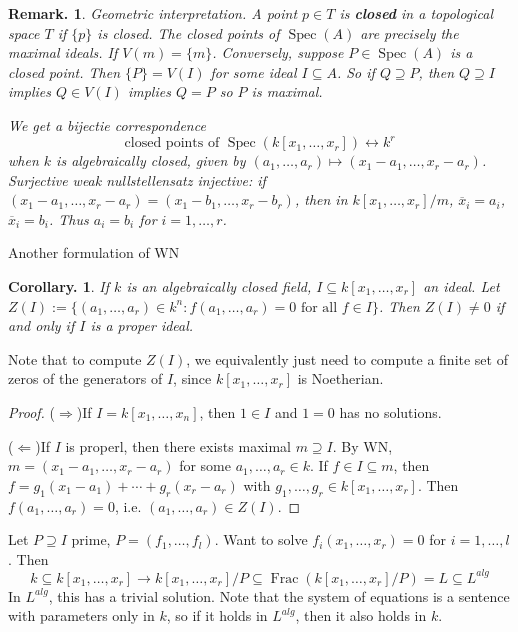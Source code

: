 \documentclass[11pt, a4paper]{memoir}
\newcommand{\impr}{{($\Rightarrow$)\hspace{0.2cm}}}
\newcommand{\impl}{{($\Leftarrow$)\hspace{0.2cm}}}
\newcommand{\ol}[1]{\ensuremath{\overline{#1}}}
\theoremstyle{change}
\newtheorem{corollary}[theorem]{Corollary.}
\theoremstyle{plain}
\theoremstyle{nonumberplain}
\newtheorem{remark}{Remark.}
\newtheorem{proof}{Proof}
\DeclareMathOperator{\Frac}{Frac}
\DeclareMathOperator{\Spec}{Spec}
\numberwithin{equation}{section}
\begin{document}
\begin{remark}
    Geometric interpretation.
    A point $p\in T$ is \textbf{closed} in a topological space $T$ if $\{p\}$ is closed.
    The closed points of $\Spec(A)$ are precisely the maximal ideals.
    If $V(m)=\{m\}$.
    Conversely, suppose $P\in\Spec(A)$ is a closed point.
    Then $\{P\}=V(I)$ for some ideal $I\subseteq A$.
    So if $Q\supseteq P$, then $Q\supseteq I$ implies $Q\in V(I)$ implies $Q=P$ so $P$ is maximal.

    We get a bijectie correspondence
    \begin{equation*}
        \text{closed points of }\Spec(k[x_1,\ldots,x_r])\leftrightarrow k^r
    \end{equation*}
    when $k$ is algebraically closed, given by $(a_1,\ldots,a_r)\mapsto(x_1-a_1,\ldots,x_r-a_r)$.
    Surjective weak nullstellensatz
    injective: if $(x_1-a_1,\ldots,x_r-a_r)=(x_1-b_1,\ldots,x_r-b_r)$, then in $k[x_1,\ldots,x_r]/m$, $\ol{x}_i=a_i$, $\ol{x}_i=b_i$.
    Thus $a_i=b_i$ for $i=1,\ldots,r$.
\end{remark}
Another formulation of WN
\begin{corollary}
    If $k$ is an algebraically closed field, $I\subseteq k[x_1,\ldots,x_r]$ an ideal.
    Let $Z(I):=\{(a_1,\ldots,a_r)\in k^n:f(a_1,\ldots,a_r)=0\text{ for all $f\in I$}\}$.
    Then $Z(I)\neq 0$ if and only if $I$ is a proper ideal.
\end{corollary}
Note that to compute $Z(I)$, we equivalently just need to compute a finite set of zeros of the generators of $I$, since $k[x_1,\ldots,x_r]$ is Noetherian.
\begin{proof}
    \impr If $I=k[x_1,\ldots,x_n]$, then $1\in I$ and $1=0$ has no solutions.

    \impl If $I$ is properl, then there exists maximal $m\supseteq I$.
    By WN, $m=(x_1-a_1,\ldots,x_r-a_r)$ for some $a_1,\ldots,a_r\in k$.
    If $f\in I\subseteq m$, then $f=g_1(x_1-a_1)+\cdots+g_r(x_r-a_r)$ with $g_1,\ldots,g_r\in k[x_1,\ldots,x_r]$.
    Then $f(a_1,\ldots,a_r)=0$, i.e. $(a_1,\ldots,a_r)\in Z(I)$.
\end{proof}
Let $P\supseteq I$ prime, $P=(f_1,\ldots,f_l)$.
Want to solve $f_i(x_1,\ldots,x_r)=0$ for $i=1,\ldots,l$.
Then
\begin{equation*}
    k\subseteq k[x_1,\ldots,x_r]\to k[x_1,\ldots,x_r]/P\subseteq\Frac(k[x_1,\ldots,x_r]/P)=L\subseteq L^{alg}
\end{equation*}
In $L^{alg}$, this has a trivial solution.
Note that the system of equations is a sentence with parameters only in $k$, so if it holds in $L^{alg}$, then it also holds in $k$.
\end{document}
